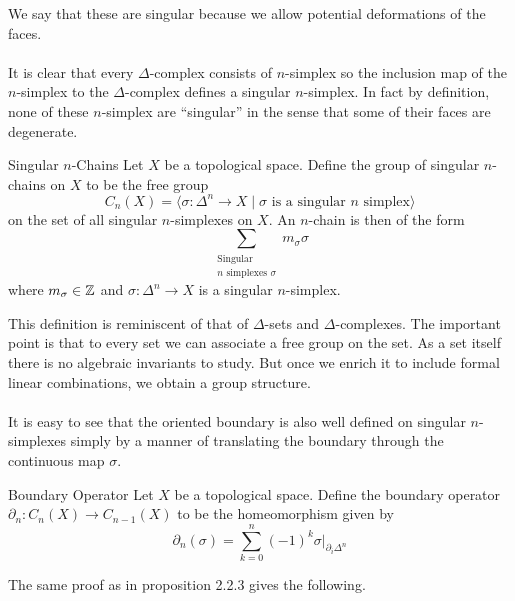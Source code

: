 \documentclass[a4paper]{article}
\begin{document}
We say that these are singular because we allow potential deformations of the faces. \\~\\

It is clear that every $\Delta$-complex consists of $n$-simplex so the inclusion map of the $n$-simplex to the $\Delta$-complex defines a singular $n$-simplex. In fact by definition, none of these $n$-simplex are ``singular'' in the sense that some of their faces are degenerate. 

\begin{defn}{Singular $n$-Chains}{} Let $X$ be a topological space. Define the group of singular $n$-chains on $X$ to be the free group $$C_n(X)=\langle\sigma:\Delta^n\to X\;|\;\sigma\text{ is a singular }n\text{ simplex}\rangle $$ on the set of all singular $n$-simplexes on $X$. An $n$-chain is then of the form $$\sum_{\substack{\text{Singular} \\ n \text{ simplexes } \sigma}}m_\sigma\sigma$$ where $m_\sigma\in\mathbb{Z}$ and $\sigma:\Delta^n\to X$ is a singular $n$-simplex. 
\end{defn}

This definition is reminiscent of that of $\Delta$-sets and $\Delta$-complexes. The important point is that to every set we can associate a free group on the set. As a set itself there is no algebraic invariants to study. But once we enrich it to include formal linear combinations, we obtain a group structure. \\~\\

It is easy to see that the oriented boundary is also well defined on singular $n$-simplexes simply by a manner of translating the boundary through the continuous map $\sigma$. 

\begin{defn}{Boundary Operator}{} Let $X$ be a topological space. Define the boundary operator $\partial_n:C_n(X)\to C_{n-1}(X)$ to be the homeomorphism given by $$\partial_n(\sigma)=\sum_{k=0}^n(-1)^k\sigma|_{\partial_i\Delta^n}$$
\end{defn}

The same proof as in proposition 2.2.3 gives the following. 
\end{document}
